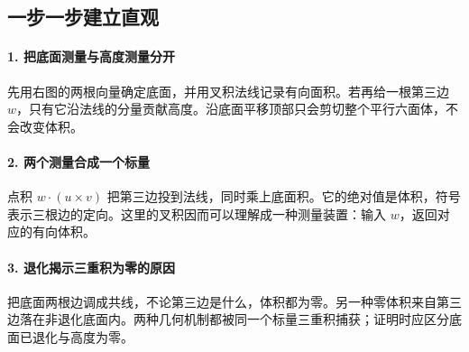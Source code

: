 \subsection*{一步一步建立直观}

\paragraph{1. 把底面测量与高度测量分开}

先用右图的两根向量确定底面，并用叉积法线记录有向面积。若再给一根第三边 $w$，只有它沿法线的分量贡献高度。沿底面平移顶部只会剪切整个平行六面体，不会改变体积。



\paragraph{2. 两个测量合成一个标量}

点积 $w\cdot(u\times v)$ 把第三边投到法线，同时乘上底面积。它的绝对值是体积，符号表示三根边的定向。这里的叉积因而可以理解成一种测量装置：输入 $w$，返回对应的有向体积。



\paragraph{3. 退化揭示三重积为零的原因}

把底面两根边调成共线，不论第三边是什么，体积都为零。另一种零体积来自第三边落在非退化底面内。两种几何机制都被同一个标量三重积捕获；证明时应区分底面已退化与高度为零。

